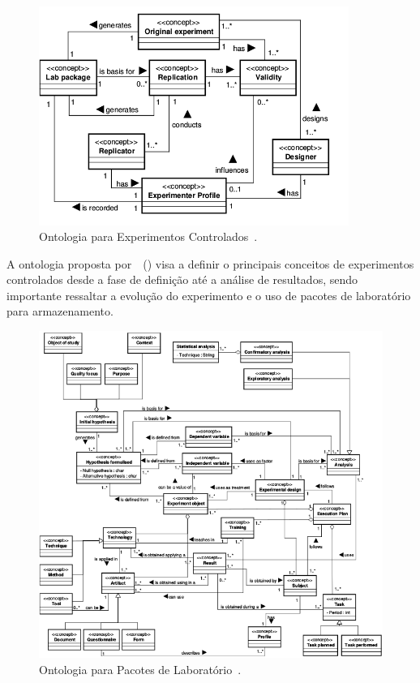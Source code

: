 \begin{figure}[!ht]
\centering
\includegraphics[width=0.9\textwidth]{images/controlados.png}
\caption{Ontologia para Experimentos Controlados~\cite{Garcia08}.}\label{fig:onto01}
\end{figure}

A ontologia proposta por~~(\citeyear{Garcia08}) visa a definir o principais conceitos de experimentos controlados desde a fase de definição até a análise de resultados, sendo importante ressaltar a evolução do experimento e o uso de pacotes de laboratório para armazenamento. 

\begin{figure}[!htb]
\centering
\includegraphics[width=\textwidth]{images/onto.png}
\caption{Ontologia para Pacotes de Laboratório~\cite{Garcia08}.}\label{fig:onto02}
\end{figure}

